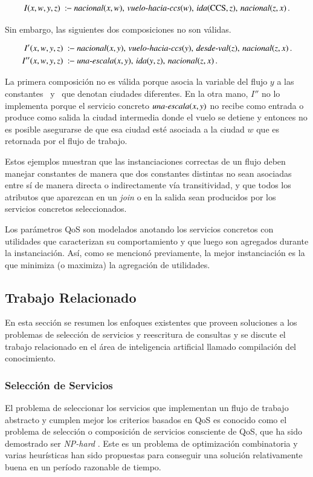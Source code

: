\[ I(x,w,y,z)\ \qrule\ \nacional(x,w),\,\vueloCCS(w),\,\ida(\PA,z),\,\nacional(z,x)\,. \]

Sin embargo, las siguientes dos composiciones no son válidas.

\begin{alignat*}{1}
I'(x,w,y,z)\  \qrule\ &\nacional(x,y),\,\vueloCCS(y),\,\desdeVAL(z),\,\nacional(z,x)\,. \\
I''(x,w,y,z)\ \qrule\ &\unaescala(x,y),\,\ida(y,z),\,\nacional(z,x)\,.
\end{alignat*}

La primera composición no es válida porque asocia la variable del flujo $y$ a
las constantes \PA\ y \NY\ que denotan ciudades diferentes. En la otra mano, $I''$
no lo implementa porque el servicio concreto $\text{\it una-escala}(x,y)$ no recibe como entrada
o produce como salida la ciudad intermedia donde el vuelo se detiene y entonces
no es posible asegurarse de que esa ciudad esté asociada a la ciudad $w$ que es
retornada por el flujo de trabajo.

Estos ejemplos muestran que las instanciaciones correctas de un flujo deben
manejar constantes de manera que dos constantes distintas no sean asociadas
entre sí de manera directa o indirectamente vía transitividad, y que todos los
atributos que aparezcan en un \emph{join} o en la salida sean producidos por los
servicios concretos seleccionados.

Los parámetros QoS son modelados anotando los servicios concretos con utilidades
que caracterizan su comportamiento y que luego son agregados durante la
instanciación. Así, como se mencionó previamente, la mejor instanciación es la
que minimiza (o maximiza) la agregación de utilidades.

\subsection{Trabajo Relacionado}

En esta sección se resumen los enfoques existentes que proveen soluciones
a los problemas de selección de servicios y reescritura de consultas y se
discute el trabajo relacionado en el área de inteligencia artificial llamado
compilación del conocimiento.

\subsubsection{Selección de Servicios}

El problema de seleccionar los servicios que implementan un flujo de trabajo
abstracto y cumplen mejor los criterios basados en QoS es conocido como el
problema de selección o composición de servicios consciente de QoS, que ha sido
demostrado ser \emph{NP-hard} \cite{Hiroshi2008}. Este es un problema de optimización
combinatoria y varias heurísticas han sido propuestas para conseguir una
solución relativamente buena en un período razonable de tiempo.

